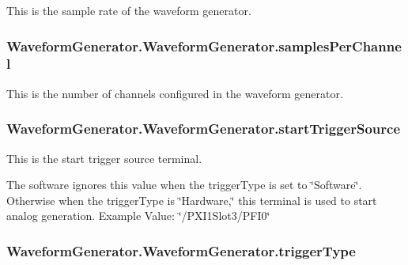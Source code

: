 This is the sample rate of the waveform generator. 

\hypertarget{class_waveform_generator_1_1_waveform_generator_a1800e5e372c200f5241f0ee132b10be3}{
\subsubsection[{samples\-Per\-Channel}]{\setlength{\rightskip}{0pt plus 5cm}Waveform\-Generator.\-Waveform\-Generator.\-samples\-Per\-Channel}}\label{class_waveform_generator_1_1_waveform_generator_a1800e5e372c200f5241f0ee132b10be3}


This is the number of channels configured in the waveform generator. 

\hypertarget{class_waveform_generator_1_1_waveform_generator_a2eb2105f7a99c224ea725a5fff4c4b39}{
\subsubsection[{start\-Trigger\-Source}]{\setlength{\rightskip}{0pt plus 5cm}Waveform\-Generator.\-Waveform\-Generator.\-start\-Trigger\-Source}}\label{class_waveform_generator_1_1_waveform_generator_a2eb2105f7a99c224ea725a5fff4c4b39}


This is the start trigger source terminal. 

The software ignores this value when the trigger\-Type is set to \char`\"{}\-Software\char`\"{}. Otherwise when the trigger\-Type is \char`\"{}\-Hardware,\char`\"{} this terminal is used to start analog generation. Example Value\-: \char`\"{}/\-P\-X\-I1\-Slot3/\-P\-F\-I0\char`\"{} \hypertarget{class_waveform_generator_1_1_waveform_generator_a240878363858425aa6c8d25241479dbf}{
\subsubsection[{trigger\-Type}]{\setlength{\rightskip}{0pt plus 5cm}Waveform\-Generator.\-Waveform\-Generator.\-trigger\-Type}}\label{class_waveform_generator_1_1_waveform_generator_a240878363858425aa6c8d25241479dbf}



